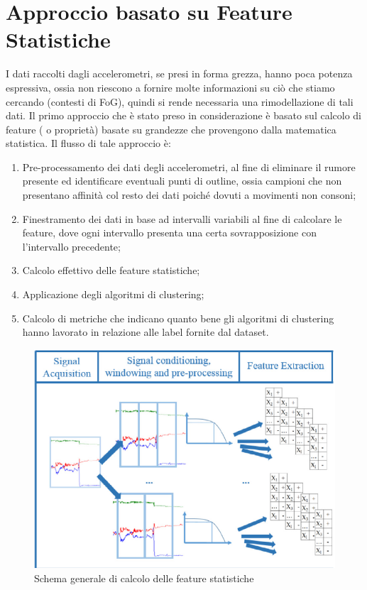 \section{Approccio basato su Feature Statistiche}
I dati raccolti dagli accelerometri, se presi in forma grezza, hanno poca potenza espressiva, ossia non riescono a fornire molte informazioni su ciò che stiamo cercando (contesti di FoG), quindi si rende necessaria una rimodellazione di tali dati. Il primo approccio che è stato preso in considerazione è basato sul calcolo di feature ( o proprietà) basate su grandezze che provengono dalla matematica statistica. Il flusso di tale approccio è:
\begin{enumerate}
	\item Pre-processamento dei dati degli accelerometri, al fine di eliminare il rumore presente ed identificare eventuali punti di outline, ossia campioni che non presentano affinità col resto dei dati poiché dovuti a movimenti non consoni;
	\item Finestramento dei dati in base ad intervalli variabili al fine di calcolare le feature, dove ogni intervallo presenta una certa sovrapposizione con l'intervallo precedente;
	\item Calcolo effettivo delle feature statistiche;
	\item Applicazione degli algoritmi di clustering;
	\item Calcolo di metriche che indicano quanto bene gli algoritmi di clustering hanno lavorato in relazione alle label fornite dal dataset.
\end{enumerate}
\begin{figure}[h!]
	\centering
	\includegraphics[scale=0.6]{images/flusso_feature.png}
	\caption{Schema generale di calcolo delle feature statistiche}
	\label{Flusso Feature}
\end{figure}
